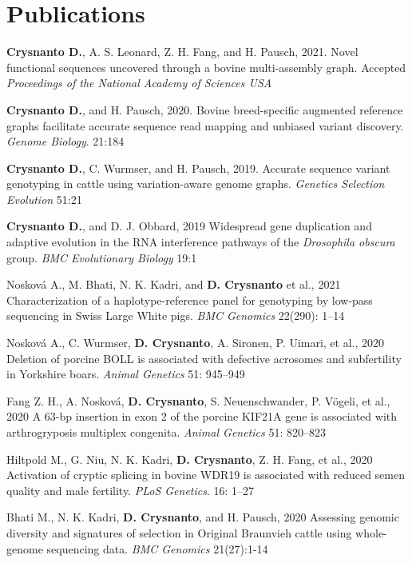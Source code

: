 \documentclass[letterpaper,10pt]{article}
\begin{document}
\section{Publications}
 \begin{enumerate}[leftmargin=0.3in]
    \small{\item{\textbf{Crysnanto D.}, A. S. Leonard, Z. H. Fang, and H. Pausch, 2021. Novel functional sequences uncovered through a bovine multi-assembly graph. Accepted \textit{Proceedings of the National Academy of Sciences USA}
    \item{\textbf{Crysnanto D.}, and H. Pausch, 2020. Bovine breed-specific augmented reference graphs facilitate accurate sequence read mapping and unbiased variant discovery. \textit{Genome Biology}. 21:184}
    \item{\textbf{Crysnanto D.}, C. Wurmser, and H. Pausch, 2019. Accurate sequence variant genotyping in cattle using variation-aware genome graphs. \textit{Genetics Selection Evolution} 51:21 }
    \item{\textbf{Crysnanto D.}, and D. J. Obbard, 2019 Widespread gene duplication and adaptive evolution in the RNA interference pathways of the \emph{Drosophila obscura} group. \textit{BMC Evolutionary Biology} 19:1}
    \item{Nosková A., M. Bhati, N. K. Kadri, and \textbf{D. Crysnanto} et al., 2021 Characterization of a haplotype-reference panel for genotyping by low-pass sequencing in Swiss Large White pigs. \emph{BMC Genomics} 22(290): 1–14}
      
    \item{Nosková A., C. Wurmser, \textbf{D. Crysnanto}, A. Sironen, P. Uimari, et al., 2020 Deletion of porcine BOLL is associated with defective acrosomes and subfertility in Yorkshire boars. \textit{Animal Genetics} 51: 945–949}
    
    \item{Fang Z. H., A. Nosková, \textbf{D. Crysnanto}, S. Neuenschwander, P. Vögeli, et al., 2020 A 63-bp insertion in exon 2 of the porcine KIF21A gene is associated with arthrogryposis multiplex congenita. \textit{Animal Genetics} 51: 820–823}
    
    \item{Hiltpold M., G. Niu, N. K. Kadri, \textbf{D. Crysnanto}, Z. H. Fang, et al., 2020 Activation of cryptic splicing in bovine WDR19 is associated with reduced semen quality and male fertility. \textit{PLoS Genetics}. 16: 1–27}
    
    \item{Bhati M., N. K. Kadri, \textbf{D. Crysnanto}, and H. Pausch, 2020 Assessing genomic diversity and signatures of selection in Original Braunvieh cattle using whole-genome sequencing data. \emph{BMC Genomics} 21(27):1-14} 
}}
 \end{enumerate}
\end{document}
